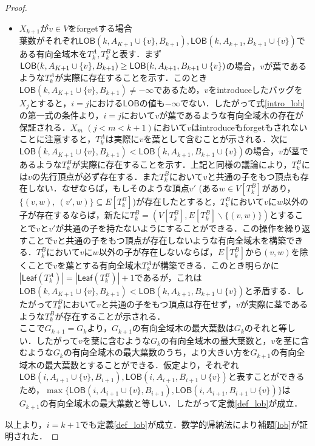\documentclass[master]{kuisthesis}		%
\theoremstyle{plain}
\theoremstyle{definition}
\begin{document}
{\begin{proof}
\begin{itemize}
        \item $X_{k+1}$が$v \in V$をforgetする場合 \\
        葉数がそれぞれ$\mathsf{LOB}(k, A_{K+1} \cup \{v\}, B_{k+1}), \mathsf{LOB}(k, A_{k+1}, B_{k+1} \cup \{v\})$である有向全域木を$T^A_k, T^B_k$と表す．まず$\mathsf{LOB}(k, A_{K+1} \cup \{v\}, B_{k+1}) \geq \\\mathsf{LOB}(k, A_{k+1}, B_{k+1} \cup \{v\})$の場合，$v$が葉であるような$T^A_k$が実際に存在することを示す．このとき$\mathsf{LOB}(k, A_{K+1} \cup \{v\}, B_{k+1}) \neq -\infty$であるため，$v$をintroduceしたバッグを$X_j$とすると，$i=j$における$\mathsf{LOB}$の値も$-\infty$でない．したがって式\ref{intro_lob}の第一式の条件より，$i=j$において$v$が葉であるような有向全域木の存在が保証される．$X_m$ $(j < m < k+1)$において$v$はintroduceもforgetもされないことに注意すると，$T^A_k$は実際に$v$を葉として含むことが示される．次に$\mathsf{LOB}(k, A_{K+1} \cup \{v\}, B_{k+1}) < \mathsf{LOB}(k, A_{k+1}, B_{k+1} \cup \{v\})$の場合，$v$が茎であるような$T^B_k$が実際に存在することを示す．上記と同様の議論により，$T^B_k$には$v$の先行頂点が必ず存在する．また$T^B_k$において$v$と共通の子をもつ頂点も存在しない．なぜならば，もしそのような頂点$v'$ (ある$w \in V[T^B_k]$があり，$\{(v, w),\ (v', w)\} \subseteq E[T^B_k]$)が存在したとすると，$T^B_k$において$v$に$w$以外の子が存在するならば，新たに$T^B_k = (V[T^B_k], E[T^B_k] \backslash \{(v, w)\})$とすることで$v$と$v'$が共通の子を持たないようにすることができる．この操作を繰り返すことで$v$と共通の子をもつ頂点が存在しないような有向全域木を構築できる．$T^B_k$において$v$に$w$以外の子が存在しないならば，$E[T^B_k]$から$(v, w)$を除くことで$v$を葉とする有向全域木$T^A_k$が構築できる．このとき明らかに$|\mathsf{Leaf}(T^A_k)| = |\mathsf{Leaf}(T^B_k)| + 1$であるが，これは$\mathsf{LOB}(k, A_{K+1} \cup \{v\}, B_{k+1}) < \mathsf{LOB}(k, A_{k+1}, B_{k+1} \cup \{v\})$と矛盾する．したがって$T^B_k$において$v$と共通の子をもつ頂点は存在せず，$v$が実際に茎であるような$T^B_k$が存在することが示される．\\
        ここで$G_{k+1} = G_k$より，$G_{k+1}$の有向全域木の最大葉数は$G_k$のそれと等しい．したがって$v$を葉に含むような$G_k$の有向全域木の最大葉数と，$v$を茎に含むような$G_k$の有向全域木の最大葉数のうち，より大きい方を$G_{k+1}$の有向全域木の最大葉数とすることができる．仮定より，それぞれ$\mathsf{LOB}(i, A_{i+1} \cup \{v\}, B_{i+1}), \mathsf{LOB}(i, A_{i+1}, B_{i+1} \cup \{v\})$と表すことができるため，$\max \{\mathsf{LOB}(i, A_{i+1} \cup \{v\}, B_{i+1}), \mathsf{LOB}(i, A_{i+1}, B_{i+1} \cup \{v\})\}$は$G_{k+1}$の有向全域木の最大葉数と等しい．したがって定義\ref{def_lob}が成立．
    \end{itemize}
    以上より，$i = k+1$でも定義\ref{def_lob}が成立．数学的帰納法により補題\ref{lob}が証明された．
\end{proof}





}
\end{document}
